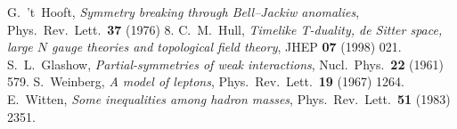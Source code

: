  G.~'t~Hooft, \emph{Symmetry breaking through Bell--Jackiw anomalies}, Phys.~Rev.~Lett.~\textbf{37} (1976) 8.
 C.~M.~Hull, \emph{Timelike T-duality, de Sitter space, large $N$ gauge theories and topological field theory}, JHEP \textbf{07} (1998) 021.
 S.~L.~Glashow, \emph{Partial-symmetries of weak interactions}, Nucl.~Phys.~\textbf{22} (1961) 579.
 S.~Weinberg, \emph{A model of leptons}, Phys.~Rev.~Lett.~\textbf{19} (1967) 1264.
 E.~Witten, \emph{Some inequalities among hadron masses}, Phys.~Rev.~Lett.~\textbf{51} (1983) 2351.
